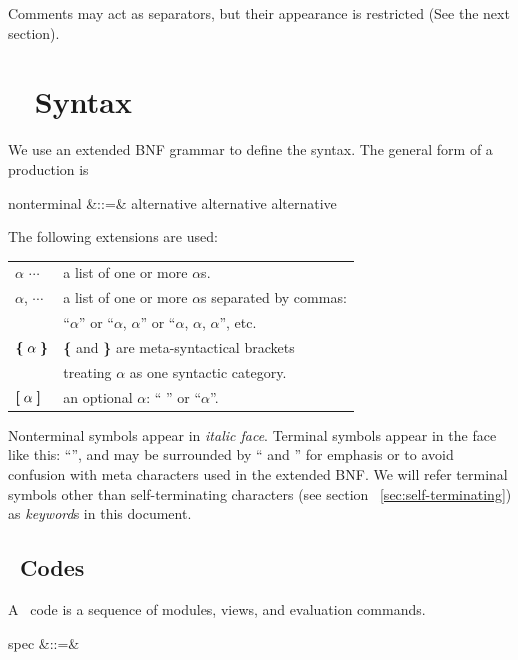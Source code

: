 \documentclass[a4paper]{memoir}
\begin{document}
Comments may act as separators, but their appearance is restricted
(See the next section).

\newpage
\section{\cafeobj~ Syntax} \label{sec:cafeobj-syntax}
We use an extended BNF grammar to define the syntax. The general form
of a production is
\begin{vvtm}
\begin{syntax}
\synindent\synindent  nonterminal &::=& alternative \alt alternative \alt \cdots \alt alternative
\end{syntax}
\end{vvtm}
The following extensions are used:
\begin{center}
\begin{fminipage}{0.7\textwidth}
  \begin{tabular}{ll}
    $\alpha$ $\cdots$ & a list of one or more $\alpha$s. \\
    $\alpha$, $\cdots$ & a list of one or more $\alpha$s separated by commas: \\
    & ``$\alpha$'' or ``$\alpha$, $\alpha$'' or ``$\alpha$, $\alpha$, $\alpha$'', etc. \\
    $\mbox{\textbf{\{}}\;{\alpha}\;\mbox{\textbf{\}}}$ & \textbf{\{} and \textbf{\}} are meta-syntactical
    brackets \\ 
    & treating $\alpha$ as one syntactic category. \\
    $\textbf{[}\;{\alpha}\;\textbf{]}$ & an optional $\alpha$: `` '' or ``$\alpha$''.
  \end{tabular}
\end{fminipage}
\end{center}
Nonterminal symbols appear in \textit{italic face}. Terminal symbols
appear in the face like this: ``'', and may be
surrounded by `` and '' for emphasis or to avoid confusion
with meta characters used in the extended BNF. We will refer terminal
symbols other than self-terminating characters (see section
~\ref{sec:self-terminating}) as \textit{keyword}s in this document.

\subsection{\cafeobj~Codes}
A \cafeobj~code is a sequence of modules, views, and evaluation commands.
\begin{vvtm}
\begin{syntax}
  \synindent\synindent spec &::=&  \cdots
\end{syntax}
\end{vvtm}
\newpage
\end{document}
